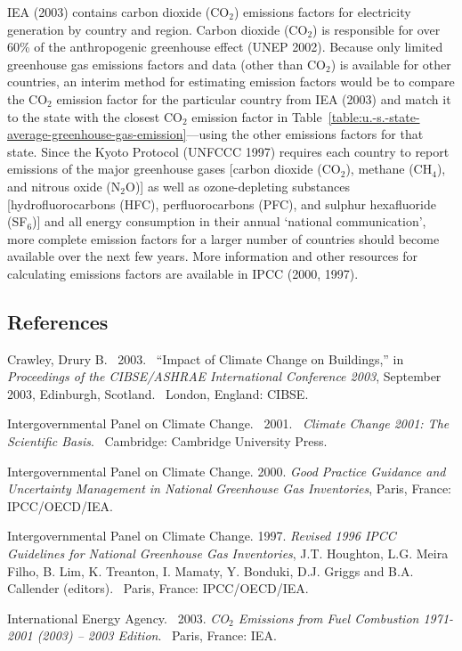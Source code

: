 IEA (2003) contains carbon dioxide (CO\(_{2}\)) emissions factors for electricity generation by country and region. Carbon dioxide (CO\(_{2}\)) is responsible for over 60\% of the anthropogenic greenhouse effect (UNEP 2002). Because only limited greenhouse gas emissions factors and data (other than CO\(_{2}\)) is available for other countries, an interim method for estimating emission factors would be to compare the CO\(_{2}\) emission factor for the particular country from IEA (2003) and match it to the state with the closest CO\(_{2}\) emission factor in Table~\ref{table:u.-s.-state-average-greenhouse-gas-emission}---using the other emissions factors for that state. Since the Kyoto Protocol (UNFCCC 1997) requires each country to report emissions of the major greenhouse gases {[}carbon dioxide (CO\(_{2}\)), methane (CH\(_{4}\)), and nitrous oxide (N\(_{2}\)O){]} as well as ozone-depleting substances {[}hydrofluorocarbons (HFC), perfluorocarbons (PFC), and sulphur hexafluoride (SF\(_{6}\)){]} and all energy consumption in their annual `national communication', more complete emission factors for a larger number of countries should become available over the next few years. More information and other resources for calculating emissions factors are available in IPCC (2000, 1997).

\subsection{References}\label{references-022}

Crawley, Drury B.~ 2003.~ ``Impact of Climate Change on Buildings,'' in \emph{Proceedings of the CIBSE/ASHRAE International Conference 2003}, September 2003, Edinburgh, Scotland.~ London, England: CIBSE.

Intergovernmental Panel on Climate Change.~ 2001.~ \emph{Climate Change 2001: The Scientific Basis}.~ Cambridge: Cambridge University Press.

Intergovernmental Panel on Climate Change. 2000. \emph{Good Practice Guidance and Uncertainty Management in National Greenhouse Gas Inventories}, Paris, France: IPCC/OECD/IEA.

Intergovernmental Panel on Climate Change. 1997. \emph{Revised 1996 IPCC Guidelines for National Greenhouse Gas Inventories}, J.T. Houghton, L.G. Meira Filho, B. Lim, K. Treanton, I. Mamaty, Y. Bonduki, D.J. Griggs and B.A. Callender (editors).~ Paris, France: IPCC/OECD/IEA.

International Energy Agency.~ 2003. \emph{CO\(_{2}\) Emissions from Fuel Combustion 1971-2001 (2003) -- 2003 Edition}.~ Paris, France: IEA.

